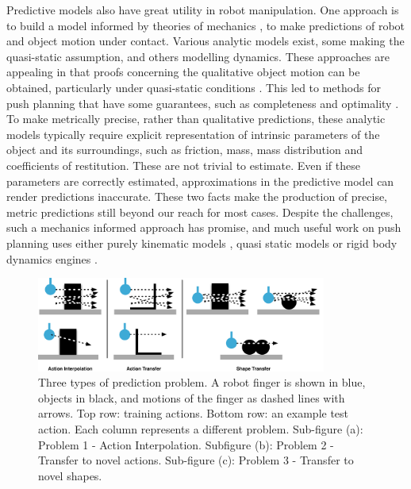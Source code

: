 Predictive models also have great utility in robot manipulation. One approach is to build a model informed by theories of mechanics \citep{mason_manipulator_1982,lynch_mechanics_1992,lynchmason96,peshkin_motion_1988,cappelleri_designing_2006,mason_mechanics_2001,flickinger2015},  to make predictions of robot and object motion under contact. Various analytic models exist, some making the quasi-static assumption, and others modelling dynamics. These approaches are appealing in that proofs concerning the qualitative object motion can be obtained, particularly under quasi-static conditions \citep{mason1985robot,peshkin_motion_1988}. This led to methods for push planning that have some guarantees, such as completeness and optimality \citep{lynchmason96}. To make metrically precise, rather than qualitative predictions, these analytic models typically require explicit representation of intrinsic parameters of the object and its surroundings, such as friction, mass, mass distribution and coefficients of restitution. These are not trivial to estimate. Even if these parameters are correctly estimated, approximations in the predictive model can render predictions inaccurate. These two facts make the production of precise, metric predictions still beyond our reach for most cases. Despite the challenges, such a mechanics informed approach has promise, and much useful work on push planning uses either purely kinematic models \citep{stillman08ijrr}, quasi static models \citep{Dogar_2010,lynchmason96} or rigid body dynamics engines \cite{zitoetal-iros12,Cosgun2011}. 
\def\stackalignment{l}
\begin{figure}[t]
\centerline{\includegraphics[width=0.85\textwidth]{three-prediction-problems}}
\caption{Three types of prediction problem. A robot finger is shown in blue, objects in black, and motions of the finger as dashed lines with arrows. Top row: training actions. Bottom row: an example test action. Each column represents a different problem. Sub-figure (a): Problem 1 - Action Interpolation. Subfigure (b): Problem 2 - Transfer to novel actions. Sub-figure (c): Problem 3 - Transfer to novel shapes. \label{fig:three-prediction-problems}}
\end{figure}
